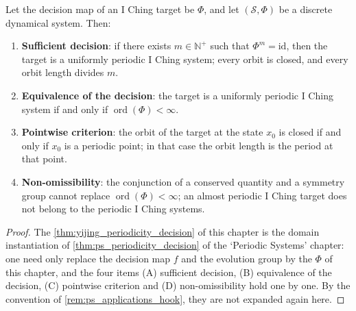 \begin{theorem}\label{thm:yijing_periodicity_decision}
Let the decision map of an I Ching target be $\Phi$, and let $(\mathcal S,\Phi)$ be a discrete dynamical system. Then:
\begin{enumerate}[label=(\Alph*)]
    \item \textbf{Sufficient decision}: if there exists $m\in\mathbb N^+$ such that $\Phi^m=\mathrm{id}$, then the target is a uniformly periodic I Ching system; every orbit is closed, and every orbit length divides $m$.
    \item \textbf{Equivalence of the decision}: the target is a uniformly periodic I Ching system if and only if $\operatorname{ord}(\Phi)<\infty$.
    \item \textbf{Pointwise criterion}: the orbit of the target at the state $x_0$ is closed if and only if $x_0$ is a periodic point; in that case the orbit length is the period at that point.
    \item \textbf{Non-omissibility}: the conjunction of a conserved quantity and a symmetry group cannot replace $\operatorname{ord}(\Phi)<\infty$; an almost periodic I Ching target does not belong to the periodic I Ching systems.
\end{enumerate}
\end{theorem}

\begin{proof}
The \cref{thm:yijing_periodicity_decision} of this chapter is the domain instantiation of \cref{thm:ps_periodicity_decision} of the `Periodic Systems' chapter:
one need only replace the decision map $f$ and the evolution group by the $\Phi$ of this chapter, and the four items (A) sufficient decision, (B) equivalence of the decision, (C) pointwise criterion
and (D) non-omissibility hold one by one. By the convention of \cref{rem:ps_applications_hook}, they are not expanded again here.
\end{proof}

